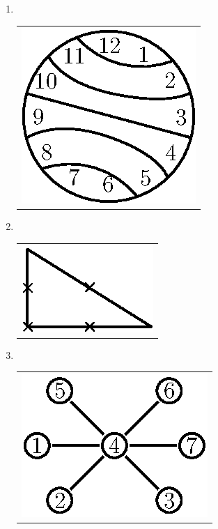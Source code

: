 \begin{enumerate}
\item 
~

  \vskip -0.4cm
  
\begin{tabular}[t]{c}
\centering
\includegraphics{src/figures/ans31.eps}
\end{tabular}

\item 
~

  \vskip -0.4cm
  
\begin{tabular}[t]{c}
\centering
\includegraphics{src/figures/ans32.eps}
\end{tabular}

\item 
~

  \vskip -0.4cm
  
\begin{tabular}[t]{c}
\centering
\includegraphics{src/figures/ans33.eps}
\end{tabular}


\end{enumerate}
